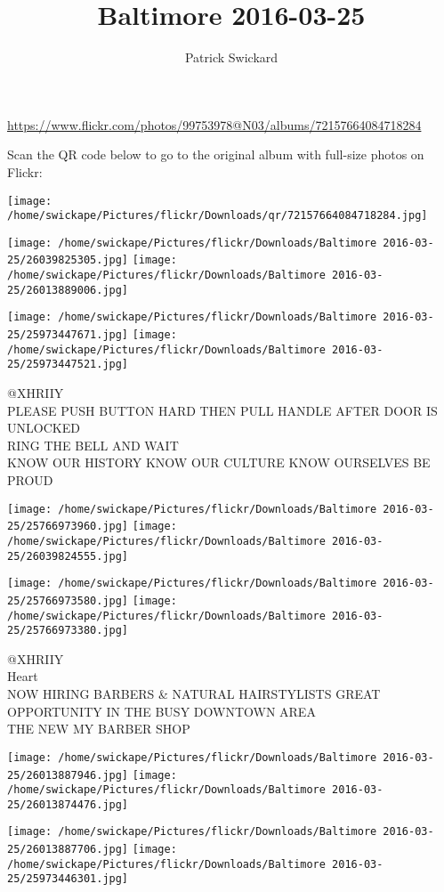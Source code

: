 \documentclass[10pt,letterpaper]{article}
\title{Baltimore 2016-03-25}
\author{Patrick Swickard}
\date{}
\begin{document}
\maketitle

\url{https://www.flickr.com/photos/99753978@N03/albums/72157664084718284}

Scan the QR code below to go to the original album with full-size photos on Flickr:

\texttt{[image: /home/swickape/Pictures/flickr/Downloads/qr/72157664084718284.jpg]}
\pagebreak

\texttt{[image: /home/swickape/Pictures/flickr/Downloads/Baltimore 2016-03-25/26039825305.jpg]}
\texttt{[image: /home/swickape/Pictures/flickr/Downloads/Baltimore 2016-03-25/26013889006.jpg]}

\texttt{[image: /home/swickape/Pictures/flickr/Downloads/Baltimore 2016-03-25/25973447671.jpg]}
\texttt{[image: /home/swickape/Pictures/flickr/Downloads/Baltimore 2016-03-25/25973447521.jpg]}

@XHRIIY\\
PLEASE PUSH BUTTON HARD THEN PULL HANDLE AFTER DOOR IS UNLOCKED\\
RING THE BELL AND WAIT\\
KNOW OUR HISTORY KNOW OUR CULTURE KNOW OURSELVES BE PROUD
\pagebreak

\texttt{[image: /home/swickape/Pictures/flickr/Downloads/Baltimore 2016-03-25/25766973960.jpg]}
\texttt{[image: /home/swickape/Pictures/flickr/Downloads/Baltimore 2016-03-25/26039824555.jpg]}

\texttt{[image: /home/swickape/Pictures/flickr/Downloads/Baltimore 2016-03-25/25766973580.jpg]}
\texttt{[image: /home/swickape/Pictures/flickr/Downloads/Baltimore 2016-03-25/25766973380.jpg]}

@XHRIIY\\
Heart\\
NOW HIRING BARBERS \& NATURAL HAIRSTYLISTS GREAT OPPORTUNITY IN THE BUSY DOWNTOWN AREA\\
THE NEW MY BARBER SHOP
\pagebreak

\texttt{[image: /home/swickape/Pictures/flickr/Downloads/Baltimore 2016-03-25/26013887946.jpg]}
\texttt{[image: /home/swickape/Pictures/flickr/Downloads/Baltimore 2016-03-25/26013874476.jpg]}

\texttt{[image: /home/swickape/Pictures/flickr/Downloads/Baltimore 2016-03-25/26013887706.jpg]}
\texttt{[image: /home/swickape/Pictures/flickr/Downloads/Baltimore 2016-03-25/25973446301.jpg]}
\end{document}
